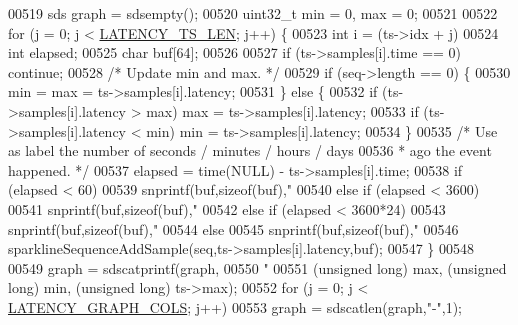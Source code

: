 \begin{DoxyCode}
{{{00519     sds graph = sdsempty();
00520     uint32\_t min = 0, max = 0;
00521 
00522     \textcolor{keywordflow}{for} (j = 0; j < \hyperlink{latency_8h_a7e3ba352d9d7bb4c88c2c42c16e6674b}{LATENCY\_TS\_LEN}; j++) \{
00523         \textcolor{keywordtype}{int} i = (ts->idx + j) %
00524         \textcolor{keywordtype}{int} elapsed;
00525         \textcolor{keywordtype}{char} buf[64];
00526 
00527         \textcolor{keywordflow}{if} (ts->samples[i].time == 0) \textcolor{keywordflow}{continue};
00528         \textcolor{comment}{/* Update min and max. */}
00529         \textcolor{keywordflow}{if} (seq->length == 0) \{
00530             min = max = ts->samples[i].latency;
00531         \} \textcolor{keywordflow}{else} \{
00532             \textcolor{keywordflow}{if} (ts->samples[i].latency > max) max = ts->samples[i].latency;
00533             \textcolor{keywordflow}{if} (ts->samples[i].latency < min) min = ts->samples[i].latency;
00534         \}
00535         \textcolor{comment}{/* Use as label the number of seconds / minutes / hours / days}
00536 \textcolor{comment}{         * ago the event happened. */}
00537         elapsed = time(NULL) - ts->samples[i].time;
00538         \textcolor{keywordflow}{if} (elapsed < 60)
00539             snprintf(buf,\textcolor{keyword}{sizeof}(buf),\textcolor{stringliteral}{"%
00540         \textcolor{keywordflow}{else} \textcolor{keywordflow}{if} (elapsed < 3600)
00541             snprintf(buf,\textcolor{keyword}{sizeof}(buf),\textcolor{stringliteral}{"%
00542         \textcolor{keywordflow}{else} \textcolor{keywordflow}{if} (elapsed < 3600*24)
00543             snprintf(buf,\textcolor{keyword}{sizeof}(buf),\textcolor{stringliteral}{"%
00544         \textcolor{keywordflow}{else}
00545             snprintf(buf,\textcolor{keyword}{sizeof}(buf),\textcolor{stringliteral}{"%
00546         sparklineSequenceAddSample(seq,ts->samples[i].latency,buf);
00547     \}
00548 
00549     graph = sdscatprintf(graph,
00550         \textcolor{stringliteral}{"%
00551         (\textcolor{keywordtype}{unsigned} \textcolor{keywordtype}{long}) max, (\textcolor{keywordtype}{unsigned} \textcolor{keywordtype}{long}) min, (\textcolor{keywordtype}{unsigned} \textcolor{keywordtype}{long}) ts->max);
00552     \textcolor{keywordflow}{for} (j = 0; j < \hyperlink{latency_8c_a3acc869332e75f8b926c821d6cc97c8e}{LATENCY\_GRAPH\_COLS}; j++)
00553         graph = sdscatlen(graph,\textcolor{stringliteral}{"-"},1);
}}}}}}}}
\end{DoxyCode}

